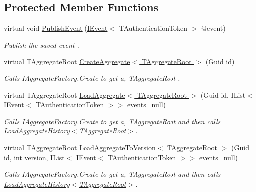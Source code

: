 \subsection*{Protected Member Functions}
\begin{DoxyCompactItemize}
\item 
virtual void \hyperlink{classCqrs_1_1Domain_1_1AggregateRepository_a3191ba3d6fa4f6b904128c4731262944_a3191ba3d6fa4f6b904128c4731262944}{Publish\+Event} (\hyperlink{interfaceCqrs_1_1Events_1_1IEvent}{I\+Event}$<$ T\+Authentication\+Token $>$ @event)
\begin{DoxyCompactList}\small\item\em Publish the saved {\itshape event} . \end{DoxyCompactList}\item 
virtual T\+Aggregate\+Root \hyperlink{classCqrs_1_1Domain_1_1AggregateRepository_a64d82c57bbe49a11bd5cf20c5b86ce19_a64d82c57bbe49a11bd5cf20c5b86ce19}{Create\+Aggregate$<$ T\+Aggregate\+Root $>$} (Guid id)
\begin{DoxyCompactList}\small\item\em Calls I\+Aggregate\+Factory.\+Create to get a, {\itshape T\+Aggregate\+Root} . \end{DoxyCompactList}\item 
virtual T\+Aggregate\+Root \hyperlink{classCqrs_1_1Domain_1_1AggregateRepository_a53bf020a5f2a0f697f361065b792cf61_a53bf020a5f2a0f697f361065b792cf61}{Load\+Aggregate$<$ T\+Aggregate\+Root $>$} (Guid id, I\+List$<$ \hyperlink{interfaceCqrs_1_1Events_1_1IEvent}{I\+Event}$<$ T\+Authentication\+Token $>$$>$ events=null)
\begin{DoxyCompactList}\small\item\em Calls I\+Aggregate\+Factory.\+Create to get a, {\itshape T\+Aggregate\+Root}  and then calls \hyperlink{classCqrs_1_1Domain_1_1AggregateRepository_af26efcb464ac989962a9ad138466e4d7_af26efcb464ac989962a9ad138466e4d7}{Load\+Aggregate\+History$<$\+T\+Aggregate\+Root$>$}. \end{DoxyCompactList}\item 
virtual T\+Aggregate\+Root \hyperlink{classCqrs_1_1Domain_1_1AggregateRepository_aa2b4511ff6327febc4bfa07567ba4385_aa2b4511ff6327febc4bfa07567ba4385}{Load\+Aggregate\+To\+Version$<$ T\+Aggregate\+Root $>$} (Guid id, int version, I\+List$<$ \hyperlink{interfaceCqrs_1_1Events_1_1IEvent}{I\+Event}$<$ T\+Authentication\+Token $>$$>$ events=null)
\begin{DoxyCompactList}\small\item\em Calls I\+Aggregate\+Factory.\+Create to get a, {\itshape T\+Aggregate\+Root}  and then calls \hyperlink{classCqrs_1_1Domain_1_1AggregateRepository_af26efcb464ac989962a9ad138466e4d7_af26efcb464ac989962a9ad138466e4d7}{Load\+Aggregate\+History$<$\+T\+Aggregate\+Root$>$}. \end{DoxyCompactList}\item 

\end{DoxyCompactItemize}
